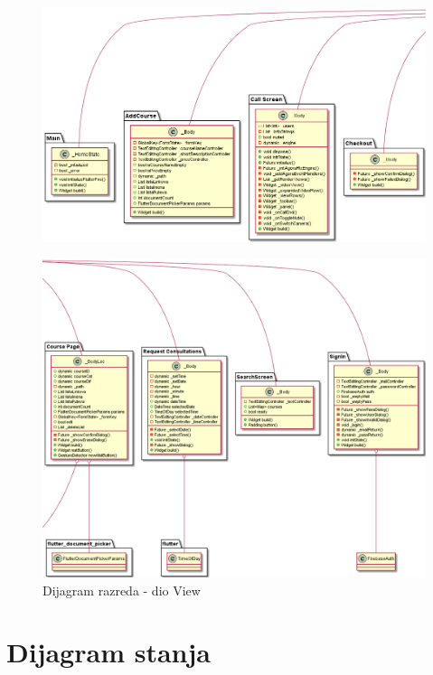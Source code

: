 			\begin{figure}[h]
				\includegraphics[scale=0.44]{dijagrami/View2.PNG}
				\centering
			\end{figure}
			
			\begin{figure}[hbt!]
				\includegraphics[scale=0.4]{dijagrami/View3.PNG}
				\centering
				\caption{Dijagram razreda - dio View}
				\label{fig:View3}
			\end{figure}
			
			\eject
			
		\section{Dijagram stanja}
			
